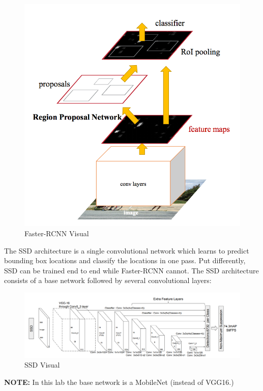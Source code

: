\documentclass[11pt]{article}
\makeatletter
\def\maxwidth{\ifdim\Gin@nat@width>\linewidth\linewidth
    \else\Gin@nat@width\fi}
\let\Oldincludegraphics\includegraphics
\renewcommand{\includegraphics}[1]{\Oldincludegraphics[width=.8\maxwidth]{#1}}
\makeatother
\begin{document}
\begin{figure}
\centering
\includegraphics{./assets/faster-rcnn.png}
\caption{Faster-RCNN Visual}
\end{figure}

    The SSD architecture is a single convolutional network which learns to
predict bounding box locations and classify the locations in one pass.
Put differently, SSD can be trained end to end while Faster-RCNN cannot.
The SSD architecture consists of a base network followed by several
convolutional layers:

\begin{figure}
\centering
\includegraphics{./assets/ssd_architecture.png}
\caption{SSD Visual}
\end{figure}

\textbf{NOTE:} In this lab the base network is a MobileNet (instead of
VGG16.)
\end{document}
